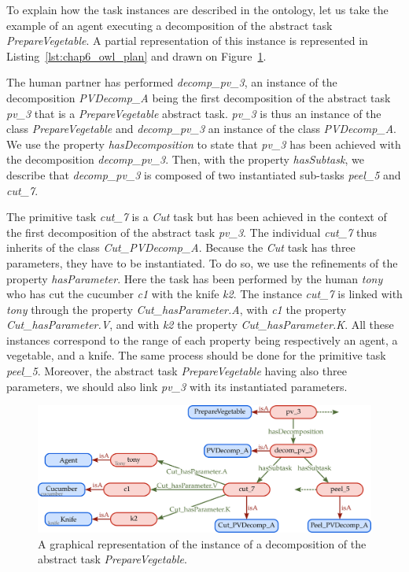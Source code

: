 To explain how the task instances are described in the ontology, let us take the example of an agent executing a decomposition of the abstract task \textit{PrepareVegetable}. A partial representation of this instance is represented in Listing~\ref{lst:chap6_owl_plan} and drawn on Figure~\ref{fig:chap6_abox}.

The human partner has performed \textit{decomp\_pv\_3}, an instance of the decomposition \textit{PVDecomp\_A} being the first decomposition of the abstract task \textit{pv\_3} that is a \textit{PrepareVegetable} abstract task. \textit{pv\_3} is thus an instance of the class \textit{PrepareVegetable} and \textit{decomp\_pv\_3} an instance of the class \textit{PVDecomp\_A}. We use the property \textit{hasDecomposition} to state that \textit{pv\_3} has been achieved with the decomposition \textit{decomp\_pv\_3}. Then, with the property \textit{hasSubtask}, we describe that \textit{decomp\_pv\_3} is composed of two instantiated sub-tasks \textit{peel\_5} and \textit{cut\_7}.

The primitive task \textit{cut\_7} is a \textit{Cut} task but has been achieved in the context of the first decomposition of the abstract task \textit{pv\_3}. The individual \textit{cut\_7} thus inherits of the class  \textit{Cut\_PVDecomp\_A}. Because the \textit{Cut} task has three parameters, they have to be instantiated. To do so, we use the refinements of the property \textit{hasParameter}. Here the task has been performed by the human \textit{tony} who has cut the cucumber \textit{c1} with the knife \textit{k2}. The instance \textit{cut\_7} is linked with \textit{tony} through the property \textit{Cut\_hasParameter.A}, with \textit{c1} the property \textit{Cut\_hasParameter.V}, and with \textit{k2} the property \textit{Cut\_hasParameter.K}. All these instances correspond to the range of each property being respectively an agent, a vegetable, and a knife. The same process should be done for the primitive task \textit{peel\_5}. Moreover, the abstract task \textit{PrepareVegetable} having also three parameters, we should also link \textit{pv\_3} with its instantiated parameters.

\begin{figure}[h!]
\centering
\includegraphics[width=\textwidth]{figures/chapter6/abox.png}
\caption{\label{fig:chap6_abox} A graphical representation of the instance of a decomposition of the abstract task \textit{PrepareVegetable}.}
\end{figure}

